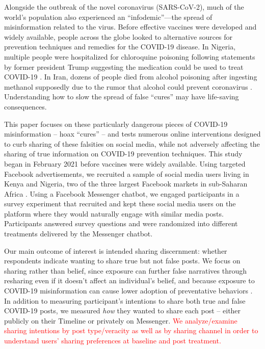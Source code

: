 \documentclass[letterpaper, 12pt, parskip=full,DIV=10]{scrartcl}
\begin{document}
Alongside the outbreak of the novel coronavirus (SARS-CoV-2), much of the world's population also experienced an ``infodemic''---the spread of misinformation related to the virus.  Before effective vaccines were developed and widely available, people across the globe looked to alternative sources for prevention techniques and remedies for the COVID-19 disease. In Nigeria, multiple people were hospitalized for chloroquine poisoning following statements by former president Trump suggesting the medication could be used to treat COVID-19 \citep{busari2020nigeria}. In Iran, dozens of people died from alcohol poisoning after ingesting methanol supposedly due to the rumor that alcohol could prevent coronavirus \citep{haghdoost2020alcohol}. %
Understanding how to slow the spread of false ``cures'' may have life-saving consequences. %


This paper focuses on these particularly dangerous pieces of COVID-19 misinformation -- hoax ``cures'' -- and tests numerous online interventions designed to curb sharing of these falsities on social media, while not adversely affecting the sharing of true information on COVID-19 prevention techniques.  This study began in February 2021 before vaccines were widely available. Using targeted Facebook advertisements, we recruited a sample of social media users living in Kenya and Nigeria, two of the three largest Facebook markets in sub-Saharan Africa \citep{world-population-reviewfacebook}. Using a Facebook Messenger chatbot,  we engaged participants in a survey experiment that recruited and kept these social media users on the platform where they would naturally engage with similar media posts.  Participants answered survey questions and were randomized into different treatments delivered by the Messenger chatbot. 


Our main outcome of interest is intended sharing discernment: whether respondents indicate wanting to share true but not false posts. We focus on sharing rather than belief, since exposure can further false narratives through resharing even if it doesn't affect an individual's belief, and because exposure to COVID-19 misinformation can cause lower adoption of preventative behaviors \citep{bursztyn2022opinions}. In addition to measuring participant's intentions to share both true and false COVID-19 posts, we measured \textit{how} they wanted to share each post -- either publicly on their Timeline or privately on Messenger. \textcolor{red}{We analyze/examine sharing intentions by post type/veracity as well as by sharing channel in order to understand users' sharing preferences at baseline and post treatment.}
\end{document}
